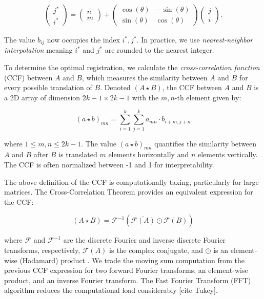 \documentclass[11pt,]{isuthesis}
\begin{document}
\begin{align*}
\begin{pmatrix} j^* \\ i^* \end{pmatrix} =
\begin{pmatrix} n \\ m \end{pmatrix} +
\begin{pmatrix} \cos(\theta) & -\sin(\theta) \\ \sin(\theta) & \cos(\theta) \end{pmatrix} \begin{pmatrix} j \\ i \end{pmatrix}.
\end{align*}

The value \(b_{ij}\) now occupies the index \(i^*, j^*\).
In practice, we use \emph{nearest-neighbor interpolation} meaning \(i^*\) and \(j^*\) are rounded to the nearest integer.

To determine the optimal registration, we calculate the \emph{cross-correlation function} (CCF) between \(A\) and \(B\), which measures the similarity between \(A\) and \(B\) for every possible translation of \(B\).
Denoted \((A \star B)\), the CCF between \(A\) and \(B\) is a 2D array of dimension \(2k - 1 \times 2k - 1\) with the \(m,n\)-th element given by:

\[
(a \star b)_{mn} = \sum_{i=1}^k \sum_{j=1}^k a_{mn} \cdot b_{i + m, j + n}
\]

where \(1 \leq m,n \leq 2k - 1\).
The value \((a \star b)_{mn}\) quantifies the similarity between \(A\) and \(B\) after \(B\) is translated \(m\) elements horizontally and \(n\) elements vertically.
The CCF is often normalized between -1 and 1 for interpretability.

The above definition of the CCF is computationally taxing, particularly for large matrices.
The Cross-Correlation Theorem provides an equivalent expression for the CCF:

\[
(A \star B) = \mathcal{F}^{-1}\left(\overline{\mathcal{F}(A)} \odot \mathcal{F}(B)\right)
\]

where \(\mathcal{F}\) and \(\mathcal{F}^{-1}\) are the discrete Fourier and inverse discrete Fourier transforms, respectively, \(\overline{\mathcal{F}(A)}\) is the complex conjugate, and \(\odot\) is an element-wise (Hadamard) product \citep{fft_brigham}.
We trade the moving sum computation from the previous CCF expression for two forward Fourier transforms, an element-wise product, and an inverse Fourier transform.
The Fast Fourier Transform (FFT) algorithm reduces the computational load considerably {[}cite Tukey{]}.
\end{document}
